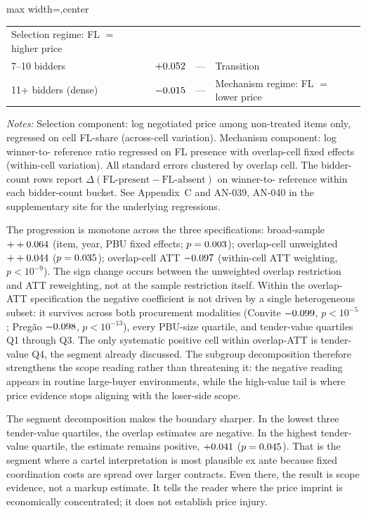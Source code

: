 \begin{table}[htbp]
\begin{adjustbox}{max width=\textwidth,center}
\begin{threeparttable}
\begin{tabular}{p{4.8cm}cp{2.0cm}p{5.6cm}}
  Selection regime: FL $=$ higher price \\
\hspace{6pt} 7--10 bidders & $+0.052$ & --- &
  Transition \\
\hspace{6pt} 11+ bidders (dense) & $-0.015$ & --- &
  Mechanism regime: FL $=$ lower price \\
\bottomrule
\end{tabular}
\begin{tablenotes}
\footnotesize
\item \textit{Notes:} Selection component: log negotiated price
among non-treated items only, regressed on cell FL-share
(across-cell variation). Mechanism component: log winner-to-
reference ratio regressed on FL presence with overlap-cell fixed
effects (within-cell variation). All standard errors clustered
by overlap cell. The bidder-count rows report
$\Delta(\text{FL-present} - \text{FL-absent})$ on winner-to-
reference within each bidder-count bucket. See Appendix~C and
AN-039, AN-040 in the supplementary site for the underlying
regressions.
\end{tablenotes}
\end{threeparttable}
\end{adjustbox}
\end{table}

The progression is monotone across the three specifications:
broad-sample $++0.064$ (item, year, PBU fixed effects;
$p=0.003$); overlap-cell unweighted $++0.044$
($p=0.035$); overlap-cell ATT $-0.097$
(within-cell ATT weighting, $p<10^{-9}$). The sign change occurs
between the unweighted overlap restriction and ATT reweighting,
not at the sample restriction itself. Within the overlap-ATT
specification the negative coefficient is not driven by a single
heterogeneous subset: it survives across both procurement
modalities (Convite $-0.099$, $p<10^{-5}$; Pregão
$-0.098$, $p<10^{-13}$), every PBU-size quartile, and
tender-value quartiles Q1 through Q3. The only systematic
positive cell within overlap-ATT is tender-value Q4, the segment
already discussed. The subgroup decomposition therefore
strengthens the scope reading rather than threatening it: the
negative reading appears in routine large-buyer environments,
while the high-value tail is where price evidence stops aligning
with the loser-side scope.

The segment decomposition makes the boundary sharper. In the
lowest three tender-value quartiles, the overlap estimates are
negative. In the highest tender-value quartile, the estimate
remains positive, $+0.041$ ($p=0.045$). That is
the segment where a cartel interpretation is most plausible ex
ante because fixed coordination costs are spread over larger
contracts. Even there, the result is scope evidence, not a
markup estimate. It tells the reader where the price imprint is
economically concentrated; it does not establish price injury.

